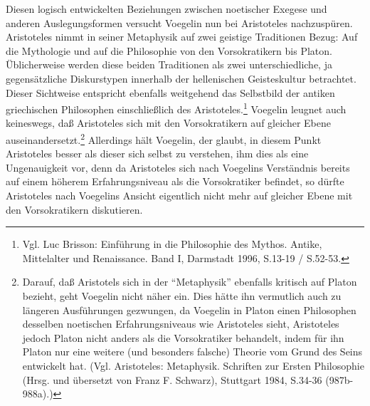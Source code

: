 Diesen logisch entwickelten Beziehungen zwischen noetischer Exegese und
anderen Auslegungsformen versucht Voegelin nun bei Aristoteles nachzuspüren.
Aristoteles nimmt in seiner Metaphysik auf zwei geistige Traditionen Bezug:
Auf die Mythologie und auf die Philosophie von den Vorsokratikern bis Platon.
Üblicherweise werden diese beiden Traditionen als zwei unterschiedliche, ja
gegensätzliche Diskurstypen innerhalb der hellenischen Geisteskultur
betrachtet. Dieser Sichtweise entspricht ebenfalls weitgehend das Selbstbild
der antiken griechischen Philosophen einschließlich des
Aristoteles.\footnote{Vgl. Luc Brisson: Einführung in die Philosophie des
  Mythos. Antike, Mittelalter und Renaissance. Band I, Darmstadt 1996, S.13-19
  / S.52-53.} Voegelin leugnet auch keineswegs, daß Aristoteles sich mit den
Vorsokratikern auf gleicher Ebene auseinandersetzt.\footnote{Darauf, daß
  Aristotels sich in der "`Metaphysik"' ebenfalls kritisch auf Platon bezieht,
  geht Voegelin nicht näher ein. Dies hätte ihn vermutlich auch zu längeren
  Ausführungen gezwungen, da Voegelin in Platon einen Philosophen desselben
  noetischen Erfahrungsniveaus wie Aristoteles sieht, Aristoteles jedoch
  Platon nicht anders als die Vorsokratiker behandelt, indem für ihn Platon
  nur eine weitere (und besonders falsche) Theorie vom Grund des Seins
  entwickelt hat. (Vgl. Aristoteles: Metaphysik. Schriften zur Ersten
  Philosophie (Hrsg. und übersetzt von Franz F. Schwarz), Stuttgart 1984,
  S.34-36 (987b-988a).)} Allerdings hält Voegelin, der glaubt, in diesem Punkt
Aristoteles besser als dieser sich selbst zu verstehen, ihm dies als eine
Ungenauigkeit vor, denn da Aristoteles sich nach Voegelins Verständnis bereits
auf einem höherem Erfahrungsniveau als die Vorsokratiker befindet, so dürfte
Aristoteles nach Voegelins Ansicht eigentlich nicht mehr auf gleicher Ebene
mit den Vorsokratikern diskutieren.
 
